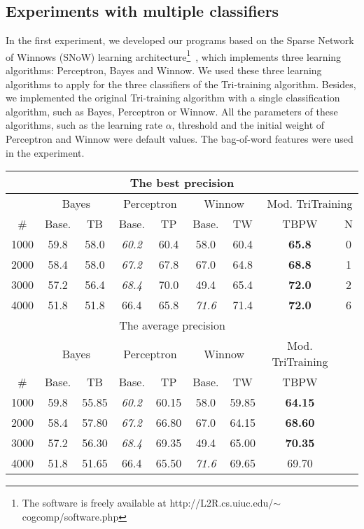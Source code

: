 \documentclass[english]{jnlp_1.4}
\begin{document}
\subsection{Experiments with multiple classifiers}

In the first experiment, we developed our programs based on the
Sparse Network of Winnows (SNoW) learning
architecture\footnote{The software is freely available at
http://L2R.cs.uiuc.edu/$\sim$cogcomp/software.php}~\cite{Andrew99},
which implements three learning algorithms: Perceptron, Bayes and
Winnow. We used these three learning algorithms to apply for the
three classifiers of the Tri-training algorithm. Besides, we
implemented the original Tri-training algorithm with a single
classification algorithm, such as Bayes, Perceptron or Winnow. All
the parameters of these algorithms, such as the learning rate
$\alpha$, threshold and the initial weight of Perceptron and
Winnow were default values. The bag-of-word features were used in
the experiment.

\begin{table}[t]
 \label{experiment1}
\centering 
\begin{tabular}{|c||c|c||c|c||c|c||c|c||}
  \hline
  \multicolumn{9}{|c|}{The best precision} \\
  \hline
   &  \multicolumn{2}{|c|}{Bayes} &  \multicolumn{2}{|c|}{Perceptron} &
  \multicolumn{2}{|c|}{Winnow}
  & \multicolumn{2}{|c|}{Mod. TriTraining} \\
  \hline
  \# &  Base. & TB &  Base. & TP &  Base. & TW &   TBPW & N \\
  \hline
  1000 & 59.8 & 58.0 & \textit{60.2} & 60.4 & 58.0 & 60.4 &  \textbf{65.8} & 0 \\
  2000 & 58.4 & 58.0 & \textit{67.2} & 67.8 & 67.0 & 64.8 &  \textbf{68.8} & 1 \\
  3000 & 57.2 & 56.4 & \textit{68.4} & 70.0 & 49.4  & 65.4  & \textbf{72.0} & 2 \\
  4000 & 51.8 & 51.8 & 66.4 & 65.8 & \textit{71.6} & 71.4 &  \textbf{72.0} & 6 \\
  \hline
  \hline
\multicolumn{8}{|c|}{The average precision} \\
  \cline{1-8}
   &  \multicolumn{2}{|c|}{Bayes} &  \multicolumn{2}{|c|}{Perceptron} &
  \multicolumn{2}{|c|}{Winnow}
  & Mod. TriTraining \\
    \cline{1-8}
  \# &  Base. & TB &  Base. & TP &  Base. & TW &   TBPW  \\
    \cline{1-8}
  1000 & 59.8 & 55.85 & \textit{60.2} & 60.15 & 58.0 & 59.85 &  \textbf{64.15}  \\
  2000 & 58.4 & 57.80 & \textit{67.2} & 66.80 & 67.0 & 64.15 &  \textbf{68.60}  \\
  3000 & 57.2 & 56.30 & \textit{68.4} & 69.35 & 49.4  & 65.00  & \textbf{70.35}  \\
  4000 & 51.8 & 51.65 & 66.4 & 65.50 & \textit{71.6} & 69.65 &  69.70 \\
    \cline{1-8}
\end{tabular}
\end{table}
\end{document}
